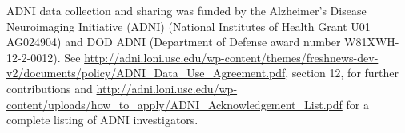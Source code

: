 \documentclass{article}
\begin{document}
\begin{ack}
ADNI data collection and sharing was funded by the Alzheimer's Disease
Neuroimaging Initiative (ADNI) (National Institutes of Health Grant U01 AG024904) and DOD ADNI (Department of Defense award number W81XWH-12-2-0012). See \url{http://adni.loni.usc.edu/wp-content/themes/freshnews-dev-v2/documents/policy/ADNI_Data_Use_Agreement.pdf}, section 12, for further contributions and \url{http://adni.loni.usc.edu/wp-content/uploads/how_to_apply/ADNI_Acknowledgement_List.pdf} for a complete listing of ADNI investigators.
\end{ack}



\end{document}
